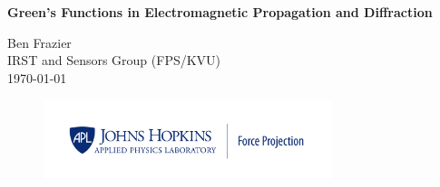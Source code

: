 \titlepage
\thispagestyle{fancy}
\begin{center}
\vspace*{50pt}
{\huge \bfseries Green's Functions in Electromagnetic Propagation and Diffraction\\}

\vspace{75 pt}

\Large Ben Frazier \\
\large IRST and Sensors Group (FPS/KVU)\\
\vspace{25pt}
\large \today \\

\begin{figure}[!b]
\begin{center}
\includegraphics[width=0.75\textwidth]{../media/FP_Blue.png}
\end{center}
\end{figure}

\end{center}


